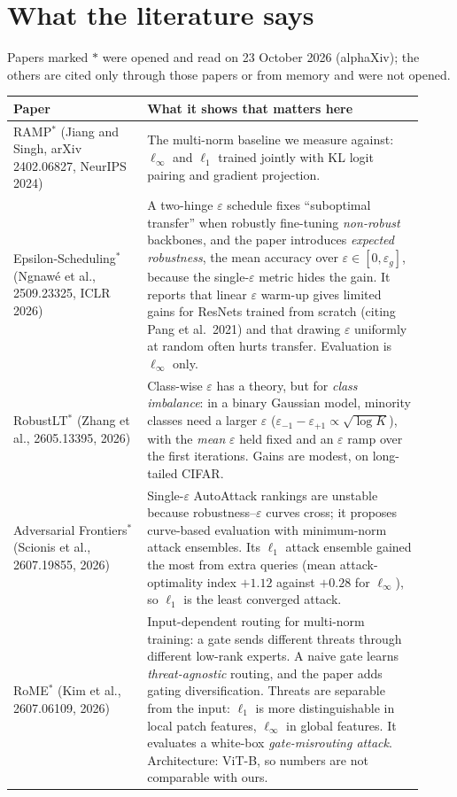 \documentclass[11pt]{article}
\begin{document}
\section{What the literature says}
Papers marked $\ast$ were opened and read on 23 October 2026 (alphaXiv); the others are cited only through those papers or from memory and were not opened.
\begin{table}[h]\centering\small
\begin{tabular}{p{0.30\linewidth}p{0.62\linewidth}}\toprule
Paper & What it shows that matters here\\\midrule
RAMP$^\ast$ (Jiang and Singh, arXiv 2402.06827, NeurIPS 2024) & The multi-norm baseline we measure against: $\ell_\infty$ and $\ell_1$ trained jointly with KL logit pairing and gradient projection.\\
Epsilon-Scheduling$^\ast$ (Ngnaw\'e et al., 2509.23325, ICLR 2026) & A two-hinge $\varepsilon$ schedule fixes ``suboptimal transfer'' when robustly fine-tuning \emph{non-robust} backbones, and the paper introduces \emph{expected robustness}, the mean accuracy over $\varepsilon\in[0,\varepsilon_g]$, because the single-$\varepsilon$ metric hides the gain. It reports that linear $\varepsilon$ warm-up gives limited gains for ResNets trained from scratch (citing Pang et al.\ 2021) and that drawing $\varepsilon$ uniformly at random often hurts transfer. Evaluation is $\ell_\infty$ only.\\
RobustLT$^\ast$ (Zhang et al., 2605.13395, 2026) & Class-wise $\varepsilon$ has a theory, but for \emph{class imbalance}: in a binary Gaussian model, minority classes need a larger $\varepsilon$ ($\varepsilon_{-1}-\varepsilon_{+1}\propto\sqrt{\log K}$), with the \emph{mean} $\varepsilon$ held fixed and an $\varepsilon$ ramp over the first iterations. Gains are modest, on long-tailed CIFAR.\\
Adversarial Frontiers$^\ast$ (Scionis et al., 2607.19855, 2026) & Single-$\varepsilon$ AutoAttack rankings are unstable because robustness--$\varepsilon$ curves cross; it proposes curve-based evaluation with minimum-norm attack ensembles. Its $\ell_1$ attack ensemble gained the most from extra queries (mean attack-optimality index $+1.12$ against $+0.28$ for $\ell_\infty$), so $\ell_1$ is the least converged attack.\\
RoME$^\ast$ (Kim et al., 2607.06109, 2026) & Input-dependent routing for multi-norm training: a gate sends different threats through different low-rank experts. A naive gate learns \emph{threat-agnostic} routing, and the paper adds gating diversification. Threats are separable from the input: $\ell_1$ is more distinguishable in local patch features, $\ell_\infty$ in global features. It evaluates a white-box \emph{gate-misrouting attack}. Architecture: ViT-B, so numbers are not comparable with ours.\\

\end{tabular}
\end{table}
\end{document}
